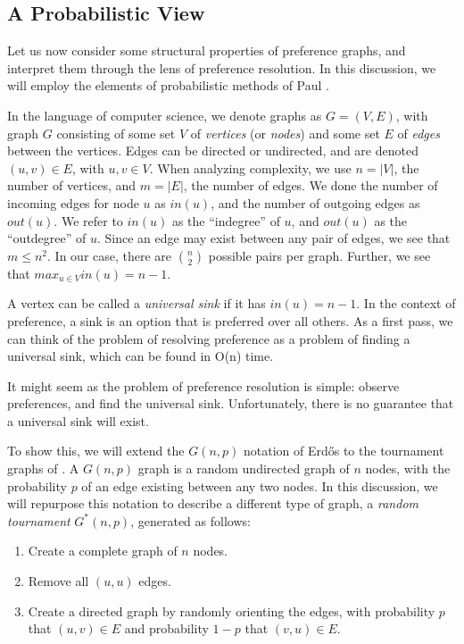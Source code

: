 \subsection{A Probabilistic View}

Let us now consider some structural properties of preference graphs, and interpret them through the lens of preference resolution.
In this discussion, we will employ the elements of probabilistic methods of Paul \cite{erdos:1959}.

\bigskip

In the language of computer science, we denote graphs as $G = (V, E)$, with graph $G$ consisting of some set $V$ of \textit{vertices} (or \textit{nodes}) and some set $E$ of \textit{edges} between the vertices.
Edges can be directed or undirected, and are denoted $(u,v) \in E$, with $u, v \in V$.
When analyzing complexity, we use $n = |V|$, the number of vertices, and $m = |E|$, the number of edges.
We done the number of incoming edges for node $u$ as $in(u)$, and the number of outgoing edges as $out(u)$.
We refer to $in(u)$ as the ``indegree'' of $u$, and $out(u)$ as the ``outdegree'' of $u$.
Since an edge may exist between any pair of edges, we see that $m \leq n^2$.
In our case, there are ${n}\choose{2}$ possible pairs per graph.
Further, we see that $max_{u \in V}in(u) = n - 1$.

A vertex can be called a \textit{universal sink} if it has $in(u) = n - 1$.
In the context of preference, a sink is an option that is preferred over all others.
As a first pass, we can think of the problem of resolving preference as a problem of finding a universal sink, which can be found in O(n) time.

It might seem as the problem of preference resolution is simple: observe preferences, and find the universal sink.
Unfortunately, there is no guarantee that a universal sink will exist.

\bigskip

To show this, we will extend the $G(n,p)$ notation of Erd{\H o}s to the tournament graphs of \cite{landau:1953}.
A $G(n,p)$ graph is a random undirected graph of $n$ nodes, with the probability $p$ of an edge existing between any two nodes.
In this discussion, we will repurpose this notation to describe a different type of graph, a \textit{random tournament} $G^*(n,p)$, generated as follows:

\begin{enumerate}
	\item Create a complete graph of $n$ nodes.
	\item Remove all $(u,u)$ edges.
	\item Create a directed graph by randomly orienting the edges, with probability $p$ that $(u, v) \in E$ and probability $1-p$ that $(v, u) \in E$.
\end{enumerate}

